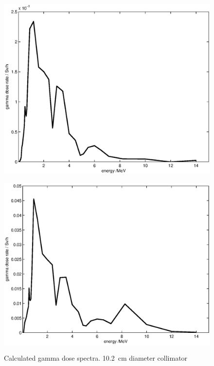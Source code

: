 \documentclass[11pt,a4paper]{IEEEtran}
\let\MYoriglatexcaption\caption
\renewcommand{\caption}[2][\relax]{\MYoriglatexcaption[#2]{#2}}
\begin{document}
\begin{figure}[t]
    \begin{minipage}{\columnwidth}
        \centering
        \includegraphics[width=0.9\columnwidth]{DoseVSenergySUP.eps}
        \label{fig:GammaDoseEnergySUP}
    \end{minipage}
    \begin{minipage}{\columnwidth}
        \centering
        \includegraphics[width=0.9\columnwidth]{DoseVSenergyCUP.eps}
        \label{fig:GammaDoseEnergyCUP}
    \end{minipage}
    \caption{
        Calculated gamma dose spectra.
        \SI{10.2}{\cm} diameter collimator
    }
    \label{fig:GammaDoseEnergy}
\end{figure}
\end{document}
